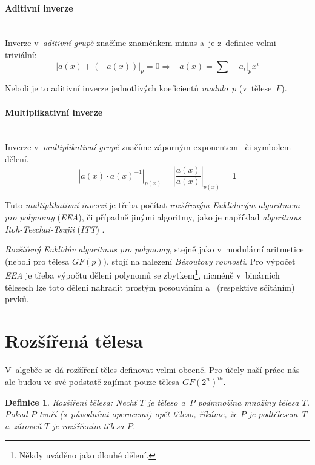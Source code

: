 \documentclass[thesis=M,czech,hidelinks]{FITthesis}[2012/06/26]
\newcommand{\0}{{\textcolor[gray]{0.75}{0}}}
\newtheorem{definice}{Definice}
\begin{document}
\paragraph{Aditivní inverze} \hfil \\
Inverze v~\emph{aditivní grupě} značíme znaménkem minus \uv{$-$} a~je z~definice
velmi triviální:
$$
    \left| a(x) + (-a(x)) \right|_p = 0 \Rightarrow -a(x) =
    \sum \left|-a_i\right|_p x^i
$$

Neboli je to aditivní inverze jednotlivých koeficientů \emph{modulo}~$p$
(v~tělese~$F$).


\paragraph{Multiplikativní inverze} \hfil \\
Inverze v~\emph{multiplikativní grupě} značíme záporným exponentem~
či symbolem dělení.
$$
    \left| a(x) \cdot a(x)^{-1} \right|_{p(x)} =
    \left| \frac{a(x)}{a(x)} \right|_{p(x)} =
    \mathbf{1}
$$

Tuto \emph{multiplikativní inverzi} je třeba počítat \emph{rozšířeným Euklidovým
algoritmem pro polynomy} (\emph{EEA}), či případně jinými algoritmy, jako je
například \emph{algoritmus Itoh-Teechai-Tsujii} (\emph{ITT}) \cite{FIT_BHW,ITT}.

\emph{Rozšířený Euklidův algoritmus} \emph{pro polynomy}, stejně jako
v~modulární aritmetice (neboli pro tělesa $GF(p)$), stojí na nalezení
\emph{Bézoutovy rovnosti}. Pro výpočet \emph{EEA} je třeba výpočtu dělení
polynomů se zbytkem\footnote{
    Někdy uváděno jako dlouhé dělení.
}, nicméně v~binárních tělesech lze toto dělení nahradit prostým posouváním
a~ (respektive sčítáním) prvků.



\section{Rozšířená tělesa}

V~algebře se dá rozšíření těles definovat velmi obecně. Pro účely naší práce
nás ale budou ve své podstatě zajímat pouze tělesa $GF(2^n)^m$.

\begin{definice}{Rozšíření tělesa:}
    Nechť $T$ je těleso a~$P$ podmnožina množiny tělesa $T$. Pokud $P$ tvoří
    (s~původními operacemi) opět těleso, říkáme, že $P$ je \emph{podtělesem}~$T$
    a~zároveň $T$ je \emph{rozšířením} tělesa $P$.
\end{definice}
\end{document}
